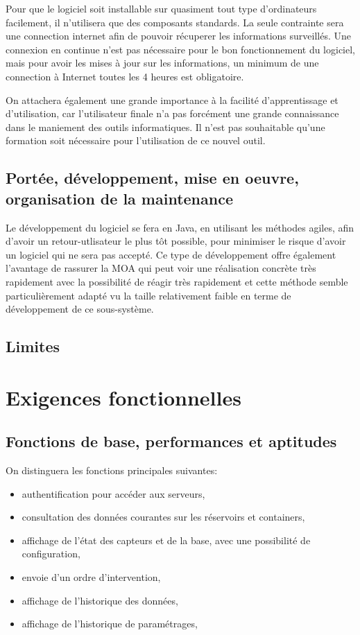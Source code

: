 Pour que le logiciel soit installable sur quasiment tout type d'ordinateurs facilement, il n'utilisera que des composants standards. La seule contrainte sera une connection internet afin de pouvoir récuperer les informations surveillés. Une connexion en continue n'est pas nécessaire pour le bon fonctionnement du logiciel, mais pour avoir les mises à jour sur les informations, un minimum de une connection à Internet toutes les 4 heures est obligatoire.

On attachera également une grande importance à la facilité d'apprentissage et d'utilisation, car l'utilisateur finale n'a pas forcément une grande connaissance dans le maniement des outils informatiques. Il n'est pas souhaitable qu'une formation soit nécessaire pour l'utilisation de ce nouvel outil.

\subsection{Portée, développement, mise en oeuvre, organisation de la maintenance}
Le développement du logiciel se fera en Java, en utilisant les méthodes agiles, afin d'avoir un retour-utlisateur le plus tôt possible, pour minimiser le risque d'avoir un logiciel qui ne sera pas accepté. Ce type de développement offre également l'avantage de rassurer la MOA qui peut voir une réalisation concrète très rapidement avec la possibilité de réagir très rapidement et cette méthode semble particulièrement adapté vu la taille relativement faible en terme de développement de ce sous-système. 

\subsection{Limites}

\section{Exigences fonctionnelles}
\subsection{Fonctions de base, performances et aptitudes}
On distinguera les fonctions principales suivantes:
\begin{itemize}
	\item authentification pour accéder aux serveurs,
	\item consultation des données courantes sur les réservoirs et containers,
	\item affichage de l'état des capteurs et de la base, avec une possibilité de configuration,
	\item envoie d'un ordre d'intervention,
	\item affichage de l'historique des données,
	\item affichage de l'historique de paramétrages,
\end{itemize}

